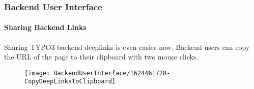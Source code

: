 %

\begin{frame}[fragile]
	\frametitle{Backend User Interface}
	\framesubtitle{Sharing Backend Links}

	Sharing TYPO3 backend deeplinks is even easier now. Backend users can copy the
	URL of the page to their clipboard with two mouse clicks.

	\begin{figure}
		\texttt{[image: BackendUserInterface/1624461728-CopyDeepLinksToClipboard]}
	\end{figure}

\end{frame}


